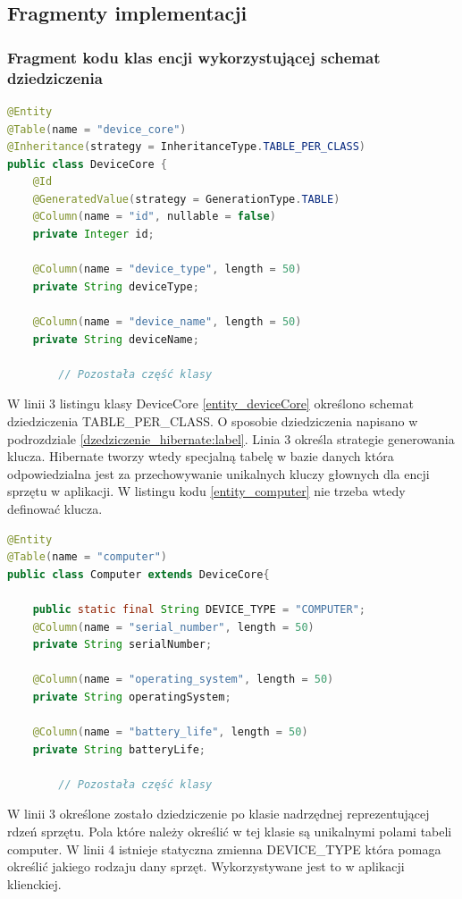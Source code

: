 \newpage
\subsection{Fragmenty implementacji}
\subsubsection {Fragment kodu klas encji wykorzystującej schemat dziedziczenia}

\begin{lstlisting}[language=Java, style=JavaStyle, caption={Klasa nadrzędna reprezentująca rdzeń sprzętu: DeviceCore}, label={entity_deviceCore}]
@Entity
@Table(name = "device_core")
@Inheritance(strategy = InheritanceType.TABLE_PER_CLASS)
public class DeviceCore {
    @Id
    @GeneratedValue(strategy = GenerationType.TABLE)
    @Column(name = "id", nullable = false)
    private Integer id;

    @Column(name = "device_type", length = 50)
    private String deviceType;

    @Column(name = "device_name", length = 50)
    private String deviceName;
		
		// Pozostała część klasy

\end{lstlisting}
W linii 3 listingu klasy DeviceCore \ref{entity_deviceCore} określono schemat dziedziczenia TABLE\_PER\_CLASS. O sposobie dziedziczenia napisano w podrozdziale \ref{dzedziczenie_hibernate:label}. Linia 3 określa strategie generowania klucza. Hibernate tworzy wtedy specjalną tabelę w bazie danych która odpowiedzialna jest za przechowywanie unikalnych kluczy głownych dla encji sprzętu w aplikacji. W listingu kodu \ref{entity_computer} nie trzeba wtedy definować klucza.

\begin{lstlisting}[language=Java, style=JavaStyle,  caption={Klasa potomna: Computer, reprezentująca komputer}, label={entity_computer}]
@Entity
@Table(name = "computer")
public class Computer extends DeviceCore{

    public static final String DEVICE_TYPE = "COMPUTER";
    @Column(name = "serial_number", length = 50)
    private String serialNumber;

    @Column(name = "operating_system", length = 50)
    private String operatingSystem;

    @Column(name = "battery_life", length = 50)
    private String batteryLife;
		
		// Pozostała część klasy
\end{lstlisting}
W linii 3 określone zostało dziedziczenie po klasie nadrzędnej reprezentującej rdzeń sprzętu. Pola które należy określić w tej klasie są unikalnymi polami tabeli computer. W linii 4 istnieje statyczna zmienna DEVICE\_TYPE która pomaga określić jakiego rodzaju dany sprzęt. Wykorzystywane jest to w aplikacji klienckiej.


